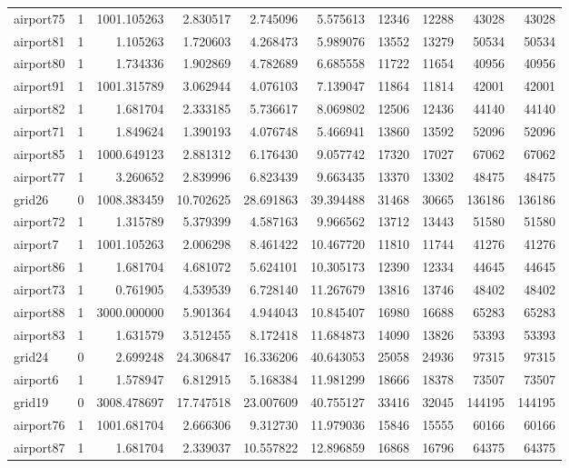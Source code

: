 \begin{longtable}{|l|r|r|r|r|r|r|r|r|r|}
airport75 & 1 & 1001.105263 & 2.830517 & 2.745096 & 5.575613 & 12346 & 12288 & 43028 & 43028 \\
airport81 & 1 & 1.105263 & 1.720603 & 4.268473 & 5.989076 & 13552 & 13279 & 50534 & 50534 \\
airport80 & 1 & 1.734336 & 1.902869 & 4.782689 & 6.685558 & 11722 & 11654 & 40956 & 40956 \\
airport91 & 1 & 1001.315789 & 3.062944 & 4.076103 & 7.139047 & 11864 & 11814 & 42001 & 42001 \\
airport82 & 1 & 1.681704 & 2.333185 & 5.736617 & 8.069802 & 12506 & 12436 & 44140 & 44140 \\
airport71 & 1 & 1.849624 & 1.390193 & 4.076748 & 5.466941 & 13860 & 13592 & 52096 & 52096 \\
airport85 & 1 & 1000.649123 & 2.881312 & 6.176430 & 9.057742 & 17320 & 17027 & 67062 & 67062 \\
airport77 & 1 & 3.260652 & 2.839996 & 6.823439 & 9.663435 & 13370 & 13302 & 48475 & 48475 \\
grid26 & 0 & 1008.383459 & 10.702625 & 28.691863 & 39.394488 & 31468 & 30665 & 136186 & 136186 \\
airport72 & 1 & 1.315789 & 5.379399 & 4.587163 & 9.966562 & 13712 & 13443 & 51580 & 51580 \\
airport7 & 1 & 1001.105263 & 2.006298 & 8.461422 & 10.467720 & 11810 & 11744 & 41276 & 41276 \\
airport86 & 1 & 1.681704 & 4.681072 & 5.624101 & 10.305173 & 12390 & 12334 & 44645 & 44645 \\
airport73 & 1 & 0.761905 & 4.539539 & 6.728140 & 11.267679 & 13816 & 13746 & 48402 & 48402 \\
airport88 & 1 & 3000.000000 & 5.901364 & 4.944043 & 10.845407 & 16980 & 16688 & 65283 & 65283 \\
airport83 & 1 & 1.631579 & 3.512455 & 8.172418 & 11.684873 & 14090 & 13826 & 53393 & 53393 \\
grid24 & 0 & 2.699248 & 24.306847 & 16.336206 & 40.643053 & 25058 & 24936 & 97315 & 97315 \\
airport6 & 1 & 1.578947 & 6.812915 & 5.168384 & 11.981299 & 18666 & 18378 & 73507 & 73507 \\
grid19 & 0 & 3008.478697 & 17.747518 & 23.007609 & 40.755127 & 33416 & 32045 & 144195 & 144195 \\
airport76 & 1 & 1001.681704 & 2.666306 & 9.312730 & 11.979036 & 15846 & 15555 & 60166 & 60166 \\
airport87 & 1 & 1.681704 & 2.339037 & 10.557822 & 12.896859 & 16868 & 16796 & 64375 & 64375 \\

\end{longtable}
